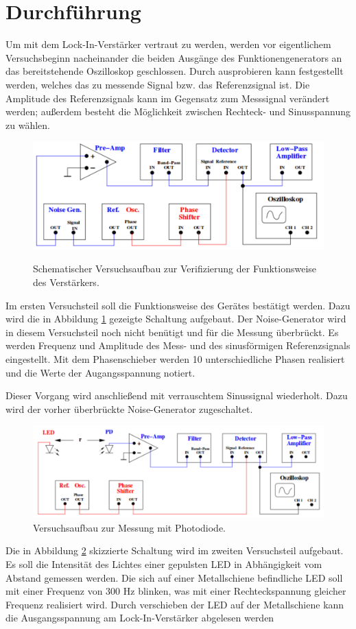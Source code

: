 \section{Durchführung}
\label{sec:Durchfuehrung}
Um mit dem Lock-In-Verstärker vertraut zu werden, werden vor eigentlichem Versuchsbeginn nacheinander die beiden Ausgänge des Funktionengenerators an das bereitstehende Oszilloskop geschlossen. Durch ausprobieren kann festgestellt werden, welches das zu messende Signal bzw. das Referenzsignal ist. Die Amplitude des Referenzsignals kann im Gegensatz zum Messsignal verändert werden; außerdem besteht die Möglichkeit zwischen Rechteck- und Sinusspannung zu wählen.
\begin{figure}
	\centering
		\includegraphics[width=\textwidth]{Bilder/Messung1.pdf}
\label{fig:M1}		
\caption{Schematischer Versuchsaufbau zur Verifizierung der Funktionsweise des Verstärkers.}
	\end{figure}

Im ersten Versuchsteil soll die Funktionsweise des Gerätes bestätigt werden. Dazu wird die in Abbildung \ref{fig:M1} gezeigte Schaltung aufgebaut. Der Noise-Generator wird in diesem Versuchsteil noch nicht benütigt und für die Messung überbrückt. Es werden Frequenz und Amplitude des Mess- und des sinusförmigen Referenzsignals eingestellt. Mit dem Phasenschieber werden 10 unterschiedliche Phasen realisiert und die Werte der Augangsspannung notiert.

Dieser Vorgang wird anschließend mit verrauschtem Sinussignal wiederholt. Dazu wird der vorher überbrückte Noise-Generator zugeschaltet.

\begin{figure}
	\centering
		\includegraphics[width=\textwidth]{Bilder/Messung2.pdf}
		\caption{Versuchsaufbau zur Messung mit Photodiode.}
		\label{fig:M2}
	\end{figure}

Die in Abbildung \ref{fig:M2} skizzierte Schaltung wird im zweiten Versuchsteil aufgebaut. Es soll die Intensität des Lichtes einer gepulsten LED in Abhängigkeit vom Abstand gemessen werden.
Die sich auf einer Metallschiene befindliche LED soll mit einer Frequenz von 300 Hz blinken, was mit einer Rechteckspannung gleicher Frequenz realisiert wird. Durch verschieben der LED auf der Metallschiene kann die Ausgangsspannung am Lock-In-Verstärker abgelesen werden
